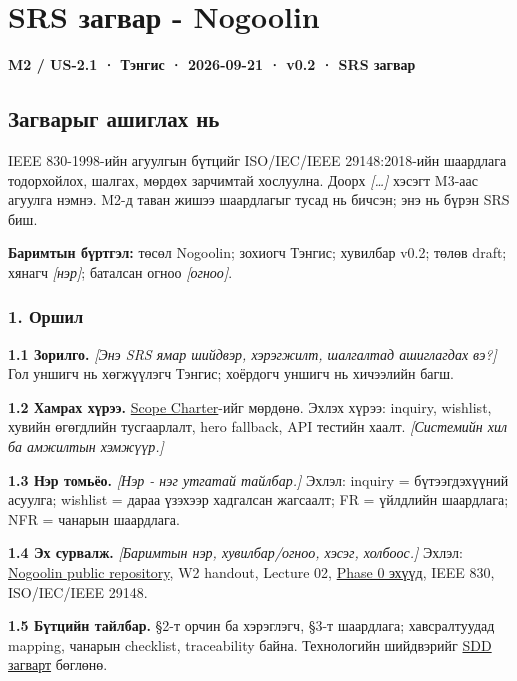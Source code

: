 \section{SRS загвар -
Nogoolin}\label{doc3-srs-ux437ux430ux433ux432ux430ux440---nogoolin}

\textbf{M2 / US-2.1 · Тэнгис · 2026-09-21 · v0.2 · SRS загвар}

\subsection{Загварыг ашиглах
нь}\label{doc3-ux437ux430ux433ux432ux430ux440ux44bux433-ux430ux448ux438ux433ux43bux430ux445-ux43dux44c}

IEEE 830-1998-ийн агуулгын бүтцийг ISO/IEC/IEEE 29148:2018-ийн шаардлага
тодорхойлох, шалгах, мөрдөх зарчимтай хослуулна. Доорх
\emph{{[}\ldots{]}} хэсэгт M3-аас агуулга нэмнэ. M2-д таван жишээ
шаардлагыг тусад нь бичсэн; энэ нь бүрэн SRS биш.

\textbf{Баримтын бүртгэл:} төсөл Nogoolin; зохиогч Тэнгис; хувилбар
v0.2; төлөв draft; хянагч \emph{{[}нэр{]}}; баталсан огноо
\emph{{[}огноо{]}}.

\subsubsection{1. Оршил}\label{doc3-ux43eux440ux448ux438ux43b}

\textbf{1.1 Зорилго.} \emph{{[}Энэ SRS ямар шийдвэр, хэрэгжилт,
шалгалтад ашиглагдах вэ?{]}} Гол уншигч нь хөгжүүлэгч Тэнгис; хоёрдогч
уншигч нь хичээлийн багш.

\textbf{1.2 Хамрах хүрээ.}
\href{../../requirements/scope-charter.md}{Scope Charter}-ийг мөрдөнө.
Эхлэх хүрээ: inquiry, wishlist, хувийн өгөгдлийн тусгаарлалт, hero
fallback, API тестийн хаалт. \emph{{[}Системийн хил ба амжилтын
хэмжүүр.{]}}

\textbf{1.3 Нэр томьёо.} \emph{{[}Нэр - нэг утгатай тайлбар.{]}} Эхлэл:
inquiry = бүтээгдэхүүний асуулга; wishlist = дараа үзэхээр хадгалсан
жагсаалт; FR = үйлдлийн шаардлага; NFR = чанарын шаардлага.

\textbf{1.4 Эх сурвалж.} \emph{{[}Баримтын нэр, хувилбар/огноо, хэсэг,
холбоос.{]}} Эхлэл: \href{https://github.com/Tengis01/Nogoolin}{Nogoolin
public repository}, W2 handout, Lecture 02,
\href{../../phase-0/README.md}{Phase 0 эхүүд}, IEEE 830, ISO/IEC/IEEE
29148.

\textbf{1.5 Бүтцийн тайлбар.} §2-т орчин ба хэрэглэгч, §3-т шаардлага;
хавсралтуудад mapping, чанарын checklist, traceability байна.
Технологийн шийдвэрийг \href{../../architecture/sdd-template.md}{SDD
загварт} бөглөнө.

